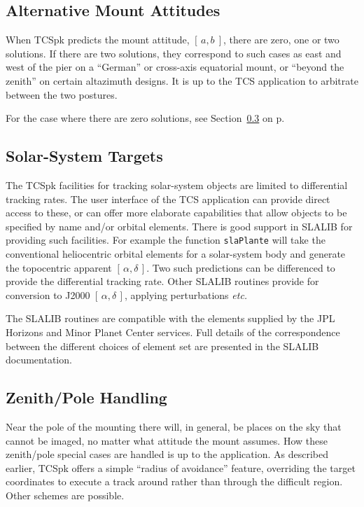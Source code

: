 \documentclass[12pt,fleqn,twoside]{article}
\renewcommand{\_}{{\tt\char'137}}     %
\newcommand{\radec}     {$[\,\alpha,\delta\,]$}
\newcommand{\ab}         {$[\,a,b~]$}
\begin{document}
\subsection{Alternative Mount Attitudes}

When TCSpk predicts the mount attitude, \ab, there are zero, one or two
solutions.  If there are two solutions, they
correspond to such cases as east and west of the
pier on a ``German'' or cross-axis equatorial mount, or ``beyond
the zenith'' on certain altazimuth designs.  It is up to the
TCS application to arbitrate between the two postures.

For the case where there are zero solutions, see Section~\ref{zph}
on p\pageref{zph}.

\subsection{Solar-System Targets}
\label{solsys}

The TCSpk facilities for tracking solar-system objects are
limited to differential tracking rates.  The user interface of the
TCS application can provide direct access to these, or can offer
more elaborate capabilities that allow objects to be specified
by name and/or orbital elements.  There is good support in SLALIB
for providing such facilities.  For example the function {\tt slaPlante}
will take the conventional heliocentric orbital elements for a
solar-system body and generate the topocentric
apparent \radec.  Two such predictions
can be differenced to provide the differential tracking rate.  Other
SLALIB routines provide for conversion to J2000 \radec, applying
perturbations {\it etc.}

The SLALIB routines are compatible with the elements supplied by
the JPL Horizons and Minor Planet Center services.  Full details of
the correspondence between the different choices of element set
are presented in the SLALIB documentation.

\subsection{Zenith/Pole Handling}
\label{zph}

Near the pole of the mounting there will, in general, be places
on the sky that cannot be imaged, no matter what attitude the
mount assumes.  How these zenith/pole special cases are
handled is up to the application.  As described
earlier, TCSpk offers a simple
``radius of avoidance'' feature, overriding the target
coordinates to execute a track around rather than through the
difficult region.  Other schemes are possible.
\end{document}
